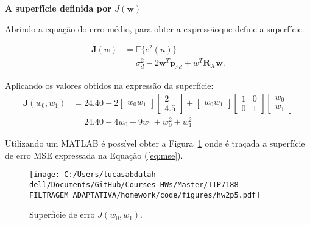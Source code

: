 \textbf{A superfície definida por $J(\mathbf{w})$}

Abrindo a equação do erro médio, para obter a expressãoque define a superfície. 

\begin{align}
    \mathbf{J}(w) &= \mathbb{E}\{e^{2}(n)\} \\
    &= \sigma^{2}_{d} - 2\mathbf{w}^{T}\mathbf{p}_{xd} + w^{T}\mathbf{R}_{X}\mathbf{w}. \label{eq:mse}   
\end{align}

Aplicando os valores obtidos na expressão da superfície:
\begin{align*}
    \mathbf{J}(w_{0}, w_{1}) &= 24.40 - 2 \left[ \begin{matrix} w_{0}  w_{1} \end{matrix} \right] \left[ \begin{matrix} 2 \\ 4.5 \end{matrix} \right] + \left[ \begin{matrix} w_{0}  w_{1} \end{matrix} \right] \left[ \begin{matrix} 1 & 0 \\ 0 & 1 \end{matrix} \right]  \left[ \begin{matrix} w_{0}  \\ w_{1} \end{matrix} \right] \\
    &= 24.40 - 4w_{0} - 9w_{1} + w^{2}_{0} + w^{2}_{1}
\end{align*}

Utilizando um MATLAB é possível obter a Figura~\ref{fig:hw2p5} onde é traçada a superfície de erro MSE expressada na Equação (\ref{eq:mse}).

\begin{figure}[!htb]
    \centering
    \texttt{[image: C:/Users/lucasabdalah-dell/Documents/GitHub/Courses-HWs/Master/TIP7188-FILTRAGEM\_ADAPTATIVA/homework/code/figures/hw2p5.pdf]}
    \caption{Superfície de erro $J(w_{0}, w_{1})$.}
    \label{fig:hw2p5}
\end{figure}